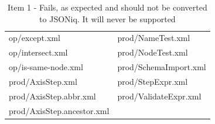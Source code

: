 \begin{table}[]
\begin{tabular}{ll}
		op/except.xml                                                                   & prod/NameTest.xml                                                                   \\
		op/intersect.xml                                                                & prod/NodeTest.xml                                                                   \\
		op/is-same-node.xml                                                             & prod/SchemaImport.xml                                                               \\
		prod/AxisStep.xml                                                               & prod/StepExpr.xml                                                                   \\
		prod/AxisStep.abbr.xml                                                          & prod/ValidateExpr.xml                                                               \\
		prod/AxisStep.ancestor.xml                                                      &                                                                                    
	\end{tabular}
	\caption{Item 1 - Fails, as expected and should not be converted to JSONiq. It will never be supported}
	\label{tab:Phase3_Item1}
\end{table}

